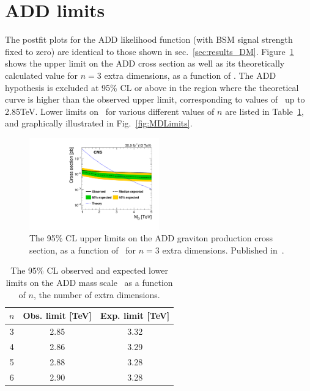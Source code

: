 \section{ADD limits} \label{sec:results_ADD}
The postfit plots for the ADD likelihood function (with BSM signal strength fixed to zero) are identical
to those shown in sec.~\ref{sec:results_DM}. Figure~\ref{fig:ADDLimits} shows the upper limit on the ADD cross section as well as its
theoretically calculated value for $n=3$ extra dimensions, as a function of \mD. The ADD hypothesis is excluded at 95\% CL or above in the region
where the theoretical curve is higher than the observed upper limit, corresponding to values of \mD\ up to 2.85\unit{TeV}.
Lower limits on \mD\ for various different values of $n$ are listed in Table~\ref{tab:MDLimits}, and graphically illustrated in Fig.~\ref{fig:MDLimits}.

\begin{figure}[htbp]
  \begin{center}
    \includegraphics[width=0.5\textwidth]{figures/exo16053/Figure_010.pdf}
    \caption{The 95\% CL upper limits on the ADD graviton production cross section, as a function of \mD\, for $n=3$ extra dimensions.
    Published in~\cite{ref:JHEP02(2019)074}.}
    \label{fig:ADDLimits}
  \end{center}
\end{figure}

\begin{table}[htbp]
  \begin{center}
    \label{tab:MDLimits}
    \begin{tabular}{|c|c|c|}
      \hline
      $n$ & Obs. limit [TeV] & Exp. limit [TeV] \\
      \hline
      3 & 2.85 & 3.32 \\
      4 & 2.86 & 3.29 \\
      5 & 2.88 & 3.28\\
      6 & 2.90 & 3.28 \\
      \hline
    \end{tabular}
    \caption{The 95\% CL observed and expected lower limits on the ADD mass scale \mD\ as a function of $n$, the number of extra dimensions.}
  \end{center}
\end{table}

